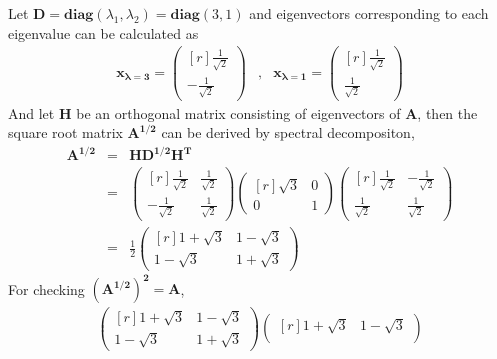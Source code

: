 \documentclass[12pt]{article} %
\begin{document}
\begin{enumerate}
\begin{enumerate}
		Let $\mathbf{D}=\mathbf{diag}(\lambda_{1}, \lambda_{2})=\mathbf{diag}(3,1)$ 
		and eigenvectors corresponding to each eigenvalue can be calculated as
		  \begin{eqnarray*}
			  \mathbf{x_{\lambda=3}}=
			  \begin{pmatrix}[r]
			   \frac{1}{\sqrt{2}}\\
			  -\frac{1}{\sqrt{2}}
			  \end{pmatrix}&,& 
			  \mathbf{x_{\lambda=1}}=
			  \begin{pmatrix}[r]
			  \frac{1}{\sqrt{2}}\\
			  \frac{1}{\sqrt{2}}
			  \end{pmatrix}  
		  \end{eqnarray*}
		And let $\mathbf{H}$ be an orthogonal matrix consisting of eigenvectors of $\mathbf{A}$, 
		then the square root matrix $\mathbf{A^{1/2}}$ can be derived by spectral decompositon, 		  
		  \begin{eqnarray*}
		  \mathbf{A^{1/2}}&=&\mathbf{HD^{1/2}H^{T}}\\
		  &=&
		  \begin{pmatrix}[r]
		  	 \frac{1}{\sqrt{2}} & \frac{1}{\sqrt{2}}\\
		  	-\frac{1}{\sqrt{2}} & \frac{1}{\sqrt{2}}
		  \end{pmatrix} 
		  \begin{pmatrix}[r]
		  	{\sqrt{3}} & 0 \\
		  	0 & 1
		  \end{pmatrix} 
		  \begin{pmatrix}[r]
		  	\frac{1}{\sqrt{2}} & -\frac{1}{\sqrt{2}}\\
		  	\frac{1}{\sqrt{2}} &  \frac{1}{\sqrt{2}}
		  \end{pmatrix}\\
		  &=&\frac{1}{2}
		  \begin{pmatrix}[r]		  
		  1+\sqrt{3} & 1-\sqrt{3}\\
		  1-\sqrt{3} & 1+\sqrt{3} 
		  \end{pmatrix}  
		 \end{eqnarray*}	
	For checking $\mathbf{(A^{1/2})^{2}=A}$, 
		\begin{eqnarray*}
		  \begin{pmatrix}[r]		  
		  1+\sqrt{3} & 1-\sqrt{3}\\
		  1-\sqrt{3} & 1+\sqrt{3} 
		  \end{pmatrix}  
		  \begin{pmatrix}[r]		  
		  1+\sqrt{3} & 1-\sqrt{3}\\

\end{pmatrix}
\end{eqnarray*}
\end{enumerate}
\end{enumerate}
\end{document}
